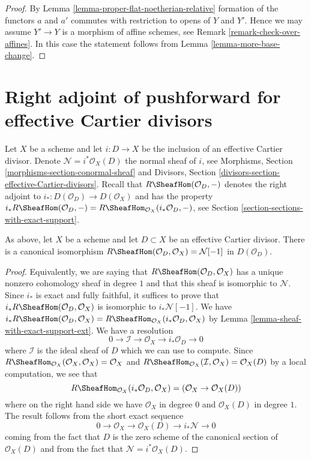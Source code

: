 \begin{proof}
By Lemma \ref{lemma-proper-flat-noetherian-relative} formation of the
functors $a$ and $a'$ commutes with restriction to opens of $Y$ and $Y'$.
Hence we may assume $Y' \to Y$ is a morphism of affine schemes, see
Remark \ref{remark-check-over-affines}. In this
case the statement follows from Lemma \ref{lemma-more-base-change}.
\end{proof}



\section{Right adjoint of pushforward for effective Cartier divisors}
\label{section-dualizing-Cartier}

\noindent
Let $X$ be a scheme and let $i : D \to X$ be the inclusion of an
effective Cartier divisor. Denote $\mathcal{N} = i^*\mathcal{O}_X(D)$
the normal sheaf of $i$, see
Morphisms, Section \ref{morphisms-section-conormal-sheaf}
and
Divisors, Section \ref{divisors-section-effective-Cartier-divisors}.
Recall that $R\SheafHom(\mathcal{O}_D, -)$
denotes the right adjoint to $i_* : D(\mathcal{O}_D) \to D(\mathcal{O}_X)$
and has the property
$i_*R\SheafHom(\mathcal{O}_D, -) =
R\SheafHom_{\mathcal{O}_X}(i_*\mathcal{O}_D, -)$,
see Section \ref{section-sections-with-exact-support}.

\begin{lemma}
\label{lemma-compute-for-effective-Cartier}
As above, let $X$ be a scheme and let $D \subset X$ be an
effective Cartier divisor. There is a canonical isomorphism
$R\SheafHom(\mathcal{O}_D, \mathcal{O}_X) = \mathcal{N}[-1]$
in $D(\mathcal{O}_D)$.
\end{lemma}

\begin{proof}
Equivalently, we are saying that $R\SheafHom(\mathcal{O}_D, \mathcal{O}_X)$
has a unique nonzero cohomology sheaf in degree $1$ and that this
sheaf is isomorphic to $\mathcal{N}$. Since $i_*$ is exact and fully
faithful, it suffices to prove that
$i_*R\SheafHom(\mathcal{O}_D, \mathcal{O}_X)$ is isomorphic
to $i_*\mathcal{N}[-1]$. We have
$i_*R\SheafHom(\mathcal{O}_D, \mathcal{O}_X) =
R\SheafHom_{\mathcal{O}_X}(i_*\mathcal{O}_D, \mathcal{O}_X)$
by Lemma \ref{lemma-sheaf-with-exact-support-ext}. We have a resolution
$$
0 \to \mathcal{I} \to \mathcal{O}_X \to i_*\mathcal{O}_D \to 0
$$
where $\mathcal{I}$ is the ideal sheaf of $D$
which we can use to compute. Since
$R\SheafHom_{\mathcal{O}_X}(\mathcal{O}_X, \mathcal{O}_X) = \mathcal{O}_X$ and
$R\SheafHom_{\mathcal{O}_X}(\mathcal{I}, \mathcal{O}_X) = \mathcal{O}_X(D)$ by
a local computation, we see that
$$
R\SheafHom_{\mathcal{O}_X}(i_*\mathcal{O}_D, \mathcal{O}_X) =
(\mathcal{O}_X \to \mathcal{O}_X(D))
$$
where on the right hand side we have $\mathcal{O}_X$ in degree $0$
and $\mathcal{O}_X(D)$ in degree $1$. The result follows from the
short exact sequence
$$
0 \to \mathcal{O}_X \to \mathcal{O}_X(D) \to i_*\mathcal{N} \to 0
$$
coming from the fact that $D$ is the zero scheme of the canonical section
of $\mathcal{O}_X(D)$ and from the fact that
$\mathcal{N} = i^*\mathcal{O}_X(D)$.
\end{proof}


